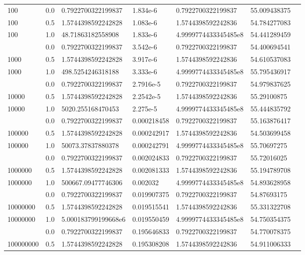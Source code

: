 \documentclass{article}
\begin{document}
\begin{landscape}
\begin{longtable}{@{}lllllll@{}}
    100 & 0.0 & 0.7922700322199837 & 1.834e-6 & 0.7922700322199837 & 55.009438375 \\
    100 & 0.5 & 1.5744398592242828 & 1.083e-6 & 1.5744398592242836 & 54.784277083 \\
    100 & 1.0 & 48.71863182558908 & 1.833e-6 & 4.9999774433345485e8 & 54.441289459 \\
    \addlinespace
    1000 & 0.0 & 0.7922700322199837 & 3.542e-6 & 0.7922700322199837 & 54.400694541 \\
    1000 & 0.5 & 1.5744398592242828 & 3.917e-6 & 1.5744398592242836 & 54.610537083 \\
    1000 & 1.0 & 498.5254246318188 & 3.333e-6 & 4.9999774433345485e8 & 55.795436917 \\
    \addlinespace
    10000 & 0.0 & 0.7922700322199837 & 2.7916e-5 & 0.7922700322199837 & 54.979837625 \\
    10000 & 0.5 & 1.5744398592242828 & 2.2542e-5 & 1.5744398592242836 & 55.29100875 \\
    10000 & 1.0 & 5020.255168470453 & 2.275e-5 & 4.9999774433345485e8 & 55.444835792 \\
    \addlinespace
    100000 & 0.0 & 0.7922700322199837 & 0.000218458 & 0.7922700322199837 & 55.163876417 \\
    100000 & 0.5 & 1.5744398592242828 & 0.000242917 & 1.5744398592242836 & 54.503699458 \\
    100000 & 1.0 & 50073.37837880378 & 0.000242791 & 4.9999774433345485e8 & 55.70697275 \\
    \addlinespace
    1000000 & 0.0 & 0.7922700322199837 & 0.002024833 & 0.7922700322199837 & 55.72016025 \\
    1000000 & 0.5 & 1.5744398592242828 & 0.002081333 & 1.5744398592242836 & 55.194789708 \\
    1000000 & 1.0 & 500667.09477746306 & 0.002032 & 4.9999774433345485e8 & 54.893628958 \\
    \addlinespace
    10000000 & 0.0 & 0.7922700322199837 & 0.019907375 & 0.7922700322199837 & 54.87693175 \\
    10000000 & 0.5 & 1.5744398592242828 & 0.019515541 & 1.5744398592242836 & 55.331322708 \\
    10000000 & 1.0 & 5.000183799199668e6 & 0.019550459 & 4.9999774433345485e8 & 54.750354375 \\
    \addlinespace
    100000000 & 0.0 & 0.7922700322199837 & 0.195646833 & 0.7922700322199837 & 54.770078375 \\
    100000000 & 0.5 & 1.5744398592242828 & 0.195308208 & 1.5744398592242836 & 54.911006333 \\

\end{longtable}
\end{landscape}
\end{document}

